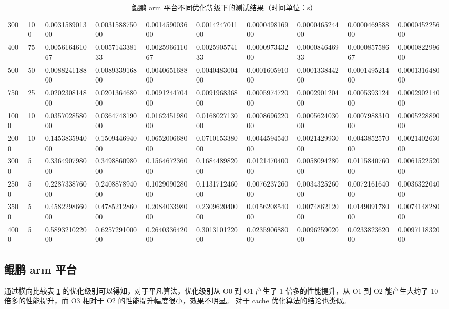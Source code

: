 \documentclass[a4paper]{article}
\begin{document}
\begin{table}[]
{\begin{tabular}{llllllllll}
      300  & 100    & 0.003158901300 & 0.003158875000 & 0.001459003600 & 0.001424701100 & 0.000049816900 & 0.000046524400 & 0.000046958800 & 0.000045225600 \\
      400  & 75     & 0.005616461067 & 0.005714338133 & 0.002596611067 & 0.002590574133 & 0.000097343200 & 0.000084646933 & 0.000085758667 & 0.000082299600 \\
      500  & 50     & 0.008824118800 & 0.008933916800 & 0.004065168800 & 0.004048300400 & 0.000160591000 & 0.000133844200 & 0.000149521400 & 0.000131648000 \\
      750  & 25     & 0.020230814800 & 0.020136468000 & 0.009124470400 & 0.009196836800 & 0.000597472000 & 0.000290120400 & 0.000539312400 & 0.000290214000 \\
      1000 & 10     & 0.035702858000 & 0.036474819000 & 0.016245198000 & 0.016802713000 & 0.000869622000 & 0.000562403000 & 0.000798831000 & 0.000522889000 \\
      2000 & 10     & 0.145383594000 & 0.150944694000 & 0.065200668000 & 0.071015338000 & 0.004459454000 & 0.002142993000 & 0.004385257000 & 0.002140263000 \\
      3000 & 5      & 0.336490798000 & 0.349886098000 & 0.156467236000 & 0.168448982000 & 0.012147040000 & 0.005809428000 & 0.011584076000 & 0.006152252000 \\
      2500 & 5      & 0.228733876000 & 0.240887894000 & 0.102909028000 & 0.113171246000 & 0.007623726000 & 0.003432526000 & 0.007216164000 & 0.003632204000 \\
      3500 & 5      & 0.458229866000 & 0.478521286000 & 0.208403398000 & 0.230962040000 & 0.015620854000 & 0.007486212000 & 0.014909178000 & 0.007414828000 \\
      4000 & 5      & 0.589321022000 & 0.625729100000 & 0.264033642000 & 0.301310122000 & 0.023590688000 & 0.009625902000 & 0.023382362000 & 0.009711832000
    \end{tabular}%
  }
  \caption{鲲鹏 arm 平台不同优化等级下的测试结果（时间单位：s）}
  \label{tab:arm-test}
\end{table}

\subsection{鲲鹏 arm 平台}
通过横向比较表 \ref{tab:arm-test} 的优化级别可以得知，对于平凡算法，优化级别从 O0 到 O1 产生了 1 倍多的性能提升，从 O1 到 O2 能产生大约了 10 倍多的性能提升，而 O3 相对于 O2 的性能提升幅度很小，效果不明显。
对于 cache 优化算法的结论也类似。
\end{document}
